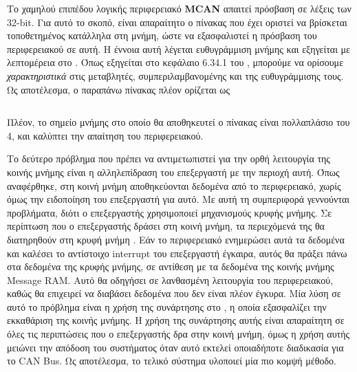 \documentclass[a4paper,nobib,justified]{tufte-book}
\begin{document}
Το χαμηλού επιπέδου λογικής περιφερειακό \textbf{MCAN} απαιτεί πρόσβαση σε λέξεις των 32-bit. Για αυτό το σκοπό, είναι απαραίτητο ο πίνακας που έχει οριστεί να βρίσκεται τοποθετημένος κατάλληλα στη μνήμη, ώστε να εξασφαλιστεί η πρόσβαση του περιφερειακού σε αυτή. Η έννοια αυτή λέγεται ευθυγράμμιση μνήμης και εξηγείται με λεπτομέρεια στο . Όπως εξηγείται στο κεφάλαιο 6.34.1 του , μπορούμε να ορίσουμε \emph{χαρακτηριστικά} στις μεταβλητές, συμπεριλαμβανομένης και της ευθυγράμμισης τους. Ως αποτέλεσμα, ο παραπάνω πίνακας πλέον ορίζεται ως \inputminted{c++}{code/examples/message-ram/alignment.cpp} Πλέον, το σημείο μνήμης στο οποίο θα αποθηκευτεί ο πίνακας είναι πολλαπλάσιο του 4, και καλύπτει την απαίτηση του περιφερειακού.



Το δεύτερο πρόβλημα που πρέπει να αντιμετωπιστεί για την ορθή λειτουργία της κοινής μνήμης είναι η αλληλεπίδραση του επεξεργαστή με την περιοχή αυτή. Όπως αναφέρθηκε, στη κοινή μνήμη αποθηκεύονται δεδομένα από το περιφερειακό, χωρίς όμως την ειδοποίηση του επεξεργαστή για αυτό. Με αυτή τη συμπεριφορά γεννούνται προβλήματα, διότι ο επεξεργαστής χρησιμοποιεί μηχανισμούς κρυφής μνήμης. Σε περίπτωση που ο επεξεργαστής δράσει στη κοινή μνήμη, τα περιεχόμενά της θα διατηρηθούν στη κρυφή μνήμη . Εάν το περιφερειακό ενημερώσει αυτά τα δεδομένα και καλέσει το αντίστοιχο interrupt του επεξεργαστή έγκαιρα, αυτός θα πράξει πάνω στα δεδομένα της κρυφής μνήμης, σε αντίθεση με τα δεδομένα της κοινής μνήμης Message RAM. Αυτό θα οδηγήσει σε λανθασμένη λειτουργία του περιφερειακού, καθώς θα επιχειρεί να διαβάσει δεδομένα που δεν είναι πλέον έγκυρα. Μία λύση σε αυτό το πρόβλημα είναι η χρήση της συνάρτησης στο , η οποία εξασφαλίζει την εκκαθάριση της κοινής μνήμης. Η χρήση της συνάρτησης αυτής είναι απαραίτητη σε όλες τις περιπτώσεις που ο επεξεργαστής δρα στην κοινή μνήμη, όμως η χρήση αυτής μειώνει την απόδοση του συστήματος όταν αυτό εκτελεί οποιαδήποτε διαδικασία για το CAN Bus. Ως αποτέλεσμα, το τελικό σύστημα υλοποιεί μία πιο κομψή μέθοδο.
\end{document}
